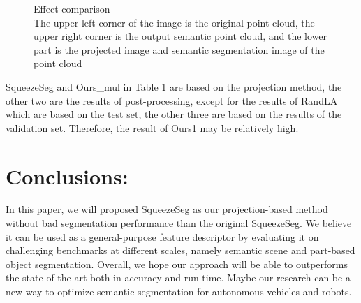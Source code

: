 \documentclass{article}
\begin{document}
\begin{normalsize}
\begin{figure}[htbp]
{        	}
        	\quad
        	\caption{Effect comparison\\The upper left corner of the image is the original point cloud, the upper right corner is the output semantic point cloud, and the lower part is the projected image and semantic segmentation image of the point cloud}
        \end{figure}
        
        SqueezeSeg and Ours\_mul in Table 1 are based on the projection method, the other two are the results of post-processing, except for the results of RandLA which are based on the test set, the other three are based on the results of the validation set. Therefore, the result of Ours1 may be relatively high.
        

       \section{Conclusions:}
        In this paper, we will proposed SqueezeSeg as our projection-based method without bad segmentation performance than the original SqueezeSeg. We believe it can be used as a general-purpose feature descriptor by evaluating it on challenging benchmarks at different scales, namely semantic scene and part-based object segmentation. Overall, we hope our approach will be able to outperforms the state of the art both in accuracy and run time. Maybe our research can be a new way to optimize semantic segmentation for autonomous vehicles and robots. 
        
    

\end{normalsize}
 
 
\end{document}
